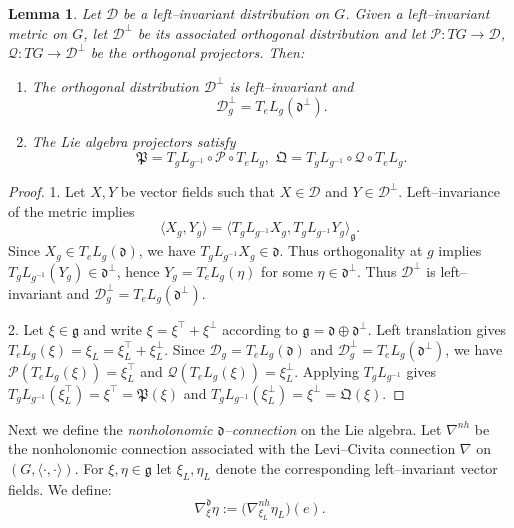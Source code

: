 \documentclass[letterpaper, 10 pt, conference]{ieeeconf}
\newtheorem{lemma}{Lemma}
\newcommand{\g}{\mathfrak{g}}
\newcommand{\h}{\mathfrak{d}}
\newcommand{\D}{\mathcal{D}}
\begin{document}
\begin{lemma}
Let $\D$ be a left--invariant distribution on $G$.  
Given a left--invariant metric on $G$, let $\D^\perp$ be its associated 
orthogonal distribution and let $\mathcal{P}:TG\to\D$, $\mathcal{Q}:TG\to\D^\perp$ 
be the orthogonal projectors. Then:
\begin{enumerate}
    \item The orthogonal distribution $\D^\perp$ is left--invariant and 
    \[
        \D^\perp_g = T_e L_g(\h^\perp).
    \]
    \item The Lie algebra projectors satisfy
    \begin{equation}\label{Lie algebra projections-LI}
        \mathfrak{P}
        = T_g L_{g^{-1}} \circ \mathcal{P} \circ T_e L_g,
        \,\,
        \mathfrak{Q}
        = T_g L_{g^{-1}} \circ \mathcal{Q} \circ T_e L_g.
    \end{equation}
\end{enumerate}
\end{lemma}

\begin{proof}
1. Let $X,Y$ be vector fields such that $X\in\D$ and $Y\in\D^\perp$.  
Left--invariance of the metric implies
\[
\langle X_g , Y_g\rangle
=
\langle T_g L_{g^{-1}} X_g , T_g L_{g^{-1}} Y_g\rangle_{\g}.
\]
Since $X_g\in T_e L_g(\h)$, we have $T_g L_{g^{-1}} X_g\in\h$.  
Thus orthogonality at $g$ implies $T_gL_{g^{-1}}(Y_g)\in\h^\perp$, hence 
$Y_g = T_e L_g(\eta)$ for some $\eta\in\h^\perp$.  
Thus $\D^\perp$ is left--invariant and $\D^\perp_g=T_eL_g(\h^\perp)$.

2. Let $\xi\in\g$ and write $\xi = \xi^\top + \xi^\perp$ according to 
$\g=\h\oplus\h^\perp$.  
Left translation gives $T_e L_g(\xi) = \xi_L = \xi^\top_L + \xi^\perp_L$. 
Since $\D_g = T_e L_g(\h)$ and $\D^\perp_g=T_e L_g(\h^\perp)$, we have
$\mathcal{P}(T_e L_g(\xi)) = \xi^\top_L$ and 
$\mathcal{Q}(T_e L_g(\xi)) = \xi^\perp_L$.  
Applying $T_g L_{g^{-1}}$ gives 
$T_g L_{g^{-1}}(\xi^\top_L) = \xi^\top = \mathfrak{P}(\xi)$ and 
$T_g L_{g^{-1}}(\xi^\perp_L) = \xi^\perp = \mathfrak{Q}(\xi)$.
\end{proof}

Next we define the \emph{nonholonomic $\h$--connection} on the Lie algebra.
Let $\nabla^{nh}$ be the nonholonomic connection associated with the 
Levi--Civita connection $\nabla$ on $(G,\langle\cdot,\cdot\rangle)$.  
For $\xi,\eta\in\g$ let $\xi_L,\eta_L$ denote the corresponding left--invariant 
vector fields.  
We define:
\begin{equation}\label{h-connection-LI}
    \nabla^\h_{\xi}\eta 
    := \big(\nabla^{nh}_{\xi_L}\eta_L\big)(e).
\end{equation}
\end{document}
